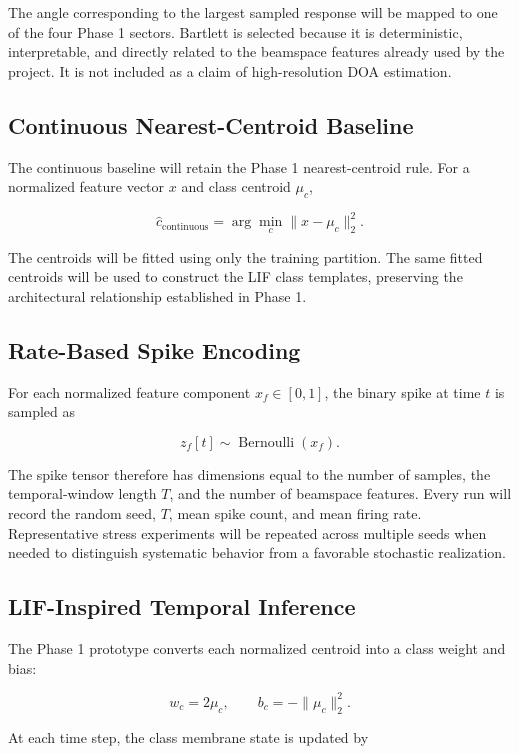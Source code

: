 The angle corresponding to the largest sampled response will be mapped to one of the four Phase 1 sectors. Bartlett is selected because it is deterministic, interpretable, and directly related to the beamspace features already used by the project. It is not included as a claim of high-resolution DOA estimation.

\subsection{Continuous Nearest-Centroid Baseline}

The continuous baseline will retain the Phase 1 nearest-centroid rule. For a normalized feature vector $x$ and class centroid $\mu_c$,

\[
\widehat{c}_{\mathrm{continuous}}
=
\arg\min_c \lVert x-\mu_c\rVert_2^2.
\]

The centroids will be fitted using only the training partition. The same fitted centroids will be used to construct the LIF class templates, preserving the architectural relationship established in Phase 1.

\subsection{Rate-Based Spike Encoding}

For each normalized feature component $x_f\in[0,1]$, the binary spike at time $t$ is sampled as

\[
z_f[t]\sim\operatorname{Bernoulli}(x_f).
\]

The spike tensor therefore has dimensions equal to the number of samples, the temporal-window length $T$, and the number of beamspace features. Every run will record the random seed, $T$, mean spike count, and mean firing rate. Representative stress experiments will be repeated across multiple seeds when needed to distinguish systematic behavior from a favorable stochastic realization.

\subsection{LIF-Inspired Temporal Inference}

The Phase 1 prototype converts each normalized centroid into a class weight and bias:

\[
w_c=2\mu_c,
\qquad
b_c=-\lVert\mu_c\rVert_2^2.
\]

At each time step, the class membrane state is updated by


